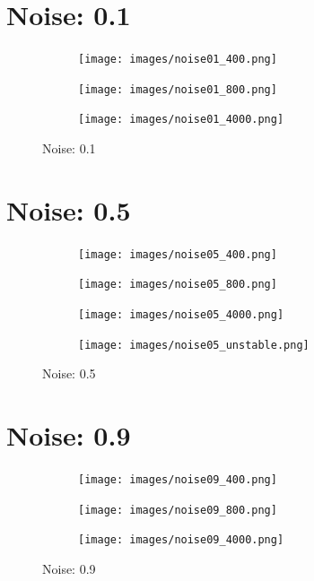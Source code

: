 \documentclass{article}
\begin{document}
\section{Noise: 0.1}
\begin{figure}[h]
	\begin{subfigure}{0.5\textwidth}
		\texttt{[image: images/noise01\_400.png]} 
		\caption{}
	\end{subfigure}
	\begin{subfigure}{0.5\textwidth}
		\texttt{[image: images/noise01\_800.png]}
		\caption{}
	\end{subfigure}
	\begin{subfigure}{0.5\textwidth}
		\texttt{[image: images/noise01\_4000.png]}
		\caption{}
	\end{subfigure}
	\caption{Noise: 0.1}
\end{figure}

\section{Noise: 0.5}
\begin{figure}[h]
	\begin{subfigure}{0.5\textwidth}
		\texttt{[image: images/noise05\_400.png]} 
		\caption{}
	\end{subfigure}
	\begin{subfigure}{0.5\textwidth}
		\texttt{[image: images/noise05\_800.png]}
		\caption{}
	\end{subfigure}
	\begin{subfigure}{0.5\textwidth}
		\texttt{[image: images/noise05\_4000.png]}
		\caption{}
	\end{subfigure}
	\begin{subfigure}{0.5\textwidth}
		\texttt{[image: images/noise05\_unstable.png]}
		\caption{}
	\end{subfigure}
	\caption{Noise: 0.5}
\end{figure}

\section{Noise: 0.9}
\begin{figure}[h]
	\begin{subfigure}{0.5\textwidth}
		\texttt{[image: images/noise09\_400.png]} 
		\caption{}
	\end{subfigure}
	\begin{subfigure}{0.5\textwidth}
		\texttt{[image: images/noise09\_800.png]}
		\caption{}
	\end{subfigure}
	\begin{subfigure}{0.5\textwidth}
		\texttt{[image: images/noise09\_4000.png]}
		\caption{}
	\end{subfigure}
	\caption{Noise: 0.9}
\end{figure}
\end{document}
